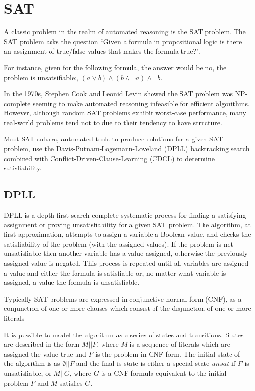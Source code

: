 \documentclass[]{final_report}
\begin{document}
\section{SAT}
A classic problem in the realm of automated reasoning is the SAT problem. The SAT problem asks the question ``Given a formula in propositional logic is there an assignment of true/false values that makes the formula true?".  ~\cite{smtwheredowegofromhere}

For instance, given for the following formula, the answer would be no, the problem is unsatsifiable:,  $(a \lor b) \land (b \land \lnot a) \land \lnot b $.

In the 1970s, Stephen Cook and Leonid Levin showed the SAT problem was NP-complete seeming to make automated reasoning infeasible for efficient algorithms. However, although random SAT problems exhibit worst-case performance, many real-world problems tend not to due to their tendency to have structure.  ~\cite{smtwheredowegofromhere}

Most SAT solvers, automated tools to produce solutions for a given SAT problem, use the Davis-Putnam-Logemann-Loveland (DPLL) backtracking search combined with Conflict-Driven-Clause-Learning (CDCL) to determine satisfiability. ~\cite{zhang2001efficient} ~\cite{gomes2008satisfiability}

\subsection{DPLL}
DPLL is a depth-first search complete systematic process for finding a satisfying assignment or proving unsatisfiability for a given SAT problem.  The algorithm, at first approximation, attempts to assign a variable a Boolean value, and checks the satisfiability of the problem (with the assigned values). If the problem is not unsatisfiable then another variable has a value assigned, otherwise the previously assigned value is negated. This process is repeated until all variables are assigned a value and either the formula is satisfiable or, no matter what variable is assigned, a value the formula is unsatisfiable. ~\cite{sattosmt}

Typically SAT problems are expressed in conjunctive-normal form (CNF), as a conjunction of one or more clauses which consist of the disjunction of one or more literals.

It is possible to model the algorithm as a series of states and transitions. States are described in the form $M || F$, where $M$ is a sequence of literals which are assigned the value true and $F$ is the problem in CNF form. The initial state of the algorithm is as $\emptyset || F $ and the final is state is either a special state $unsat$ if $F$ is unsatisfiable, or $M || G $, where $G$ is a CNF formula equivalent to the initial problem $F$ and $M$ satisfies $G$. 
\end{document}
